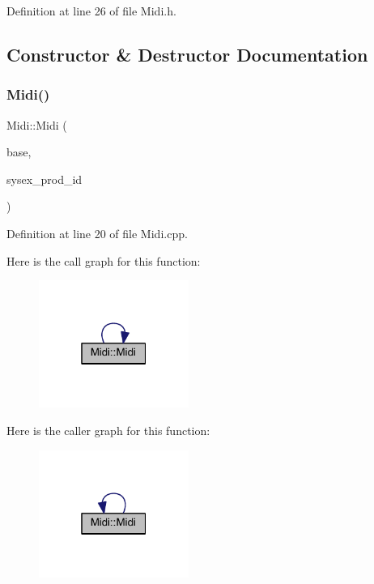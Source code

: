 Definition at line 26 of file Midi.\+h.



\subsection{Constructor \& Destructor Documentation}
\mbox{\label{class_midi_aaf0c677f66873f3743cf41e655309df9}} 
\subsubsection{\texorpdfstring{Midi()}{Midi()}}
{\footnotesize\ttfamily Midi\+::\+Midi (\begin{DoxyParamCaption}\item[{\hyperlink{class_midi_base}{Midi\+Base} $\ast$}]{base,  }\item[{unsigned char}]{sysex\+\_\+prod\+\_\+id }\end{DoxyParamCaption})}



Definition at line 20 of file Midi.\+cpp.

Here is the call graph for this function\+:
\nopagebreak
\begin{figure}[H]
\begin{center}
\leavevmode
\includegraphics[width=139pt]{da/db9/class_midi_aaf0c677f66873f3743cf41e655309df9_cgraph}
\end{center}
\end{figure}
Here is the caller graph for this function\+:
\nopagebreak
\begin{figure}[H]
\begin{center}
\leavevmode
\includegraphics[width=139pt]{da/db9/class_midi_aaf0c677f66873f3743cf41e655309df9_icgraph}
\end{center}
\end{figure}
\mbox{\label{class_midi_a3caa6150d8a34528c034eac4697e36b6}} 
